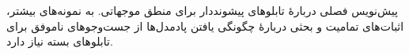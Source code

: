 \documentclass[../../../include/open-logic-chapter]{subfiles}
\begin{document}

\begin{editorial}
  پیش‌نویس فصلی دربارهٔ تابلوهای پیشونددار برای منطق موجهاتی. به
  نمونه‌های بیشتر، اثبات‌های تمامیت و بحثی دربارهٔ چگونگی یافتن
  پادمدل‌ها از جست‌وجوهای ناموفق برای تابلوهای بسته نیاز دارد.
\end{editorial}


\OLEndChapterHook
\end{document}
